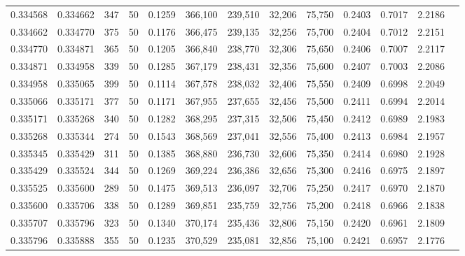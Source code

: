 \begin{tabular}{rrrrrrrrrrrrr}
0.334568 & 0.334662 &   347 &  50 &                                     0.1259 & 366,100 & 239,510 &  32,206 &  75,750 & 0.2403 & 0.7017 & 2.2186 \\
0.334662 & 0.334770 &   375 &  50 &                                     0.1176 & 366,475 & 239,135 &  32,256 &  75,700 & 0.2404 & 0.7012 & 2.2151 \\
0.334770 & 0.334871 &   365 &  50 &                                     0.1205 & 366,840 & 238,770 &  32,306 &  75,650 & 0.2406 & 0.7007 & 2.2117 \\
0.334871 & 0.334958 &   339 &  50 &                                     0.1285 & 367,179 & 238,431 &  32,356 &  75,600 & 0.2407 & 0.7003 & 2.2086 \\
0.334958 & 0.335065 &   399 &  50 &                                     0.1114 & 367,578 & 238,032 &  32,406 &  75,550 & 0.2409 & 0.6998 & 2.2049 \\
0.335066 & 0.335171 &   377 &  50 &                                     0.1171 & 367,955 & 237,655 &  32,456 &  75,500 & 0.2411 & 0.6994 & 2.2014 \\
0.335171 & 0.335268 &   340 &  50 &                                     0.1282 & 368,295 & 237,315 &  32,506 &  75,450 & 0.2412 & 0.6989 & 2.1983 \\
0.335268 & 0.335344 &   274 &  50 &                                     0.1543 & 368,569 & 237,041 &  32,556 &  75,400 & 0.2413 & 0.6984 & 2.1957 \\
0.335345 & 0.335429 &   311 &  50 &                                     0.1385 & 368,880 & 236,730 &  32,606 &  75,350 & 0.2414 & 0.6980 & 2.1928 \\
0.335429 & 0.335524 &   344 &  50 &                                     0.1269 & 369,224 & 236,386 &  32,656 &  75,300 & 0.2416 & 0.6975 & 2.1897 \\
0.335525 & 0.335600 &   289 &  50 &                                     0.1475 & 369,513 & 236,097 &  32,706 &  75,250 & 0.2417 & 0.6970 & 2.1870 \\
0.335600 & 0.335706 &   338 &  50 &                                     0.1289 & 369,851 & 235,759 &  32,756 &  75,200 & 0.2418 & 0.6966 & 2.1838 \\
0.335707 & 0.335796 &   323 &  50 &                                     0.1340 & 370,174 & 235,436 &  32,806 &  75,150 & 0.2420 & 0.6961 & 2.1809 \\
0.335796 & 0.335888 &   355 &  50 &                                     0.1235 & 370,529 & 235,081 &  32,856 &  75,100 & 0.2421 & 0.6957 & 2.1776 \\

\end{tabular}
